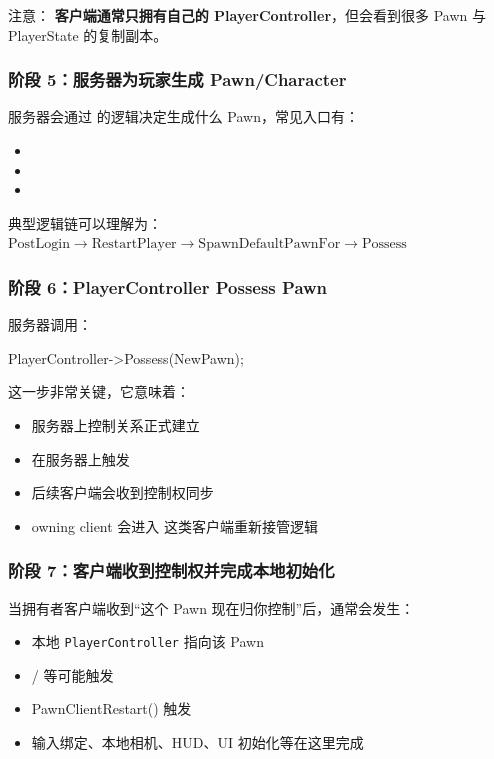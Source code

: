 注意：
\textbf{客户端通常只拥有自己的 PlayerController}，但会看到很多 Pawn 与 PlayerState 的复制副本。

\subsubsection{阶段 5：服务器为玩家生成 Pawn/Character}
服务器会通过  的逻辑决定生成什么 Pawn，常见入口有：
\begin{itemize}
	\item {}
	\item {}
	\item {}
\end{itemize}

典型逻辑链可以理解为：
$
\text{PostLogin}
\rightarrow
\text{RestartPlayer}
\rightarrow
\text{SpawnDefaultPawnFor}
\rightarrow
\text{Possess}
$


\subsubsection{阶段 6：PlayerController Possess Pawn}
服务器调用：

\begin{code}[language=C++]
	PlayerController->Possess(NewPawn);
\end{code}

这一步非常关键，它意味着：

\begin{itemize}
	\item 服务器上控制关系正式建立
	\item {} 在服务器上触发
	\item 后续客户端会收到控制权同步
	\item owning client 会进入  这类客户端重新接管逻辑
\end{itemize}


\subsubsection{阶段 7：客户端收到控制权并完成本地初始化}
当拥有者客户端收到“这个 Pawn 现在归你控制”后，通常会发生：

\begin{itemize}
	\item 本地 \texttt{PlayerController} 指向该 Pawn
	\item {} /  等可能触发
	\item PawnClientRestart() 触发
	\item 输入绑定、本地相机、HUD、UI 初始化等在这里完成
\end{itemize}

